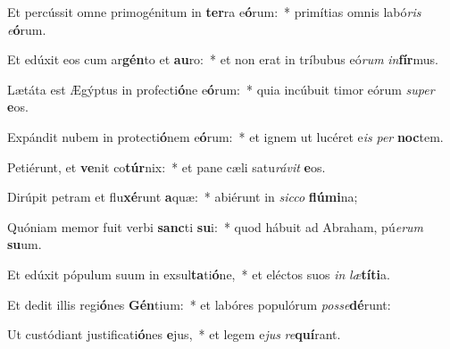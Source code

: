 \item Et percússit omne primogénitum in \textbf{ter}ra e\textbf{ó}rum:~* primítias omnis labó\textit{ris} \textit{e}\textbf{ó}rum.
\item Et edúxit eos cum ar\textbf{gén}to et \textbf{au}ro:~* et non erat in tríbubus eó\textit{rum} \textit{in}\textbf{fír}mus.
\item Lætáta est Ægýptus in profecti\textbf{ó}ne e\textbf{ó}rum:~* quia incúbuit timor eórum \textit{su}\textit{per} \textbf{e}os.
\item Expándit nubem in protecti\textbf{ó}nem e\textbf{ó}rum:~* et ignem ut lucéret e\textit{is} \textit{per} \textbf{noc}tem.
\item Petiérunt, et \textbf{ve}nit co\textbf{túr}nix:~* et pane cæli satu\textit{rá}\textit{vit} \textbf{e}os.
\item Dirúpit petram et flu\textbf{xé}runt \textbf{a}quæ:~* abiérunt in \textit{sic}\textit{co} \textbf{flú}\textbf{mi}na;
\item Quóniam memor fuit verbi \textbf{sanc}ti \textbf{su}i:~* quod hábuit ad Abraham, pú\textit{e}\textit{rum} \textbf{su}um.
\item Et edúxit pópulum suum in exsul\textbf{ta}ti\textbf{ó}ne,~* et eléctos suos \textit{in} \textit{læ}\textbf{tí}\textbf{ti}a.
\item Et dedit illis regi\textbf{ó}nes \textbf{Gén}tium:~* et labóres populórum \textit{pos}\textit{se}\textbf{dé}runt:
\item Ut custódiant justificati\textbf{ó}nes \textbf{e}jus,~* et legem e\textit{jus} \textit{re}\textbf{quí}rant.
